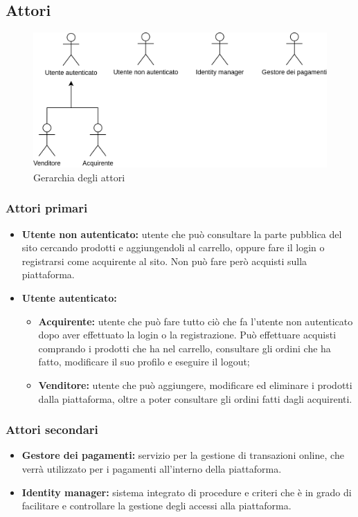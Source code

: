 \subsection{Attori} \label{Attori}

\begin{figure}[ht]
    \centering
    \includegraphics[width=\textwidth]{Immagini/DiagrammiUC/Attori.png}
    \caption{Gerarchia degli attori} 
    \label{fig:attori}
\end{figure}

\subsubsection{Attori primari}
\begin{itemize}
    \item \textbf{Utente non autenticato:} utente che può consultare la parte pubblica del sito cercando prodotti e aggiungendoli al carrello, oppure fare il login o registrarsi come acquirente al sito. Non può fare però acquisti sulla piattaforma.
    \item \textbf{Utente autenticato:}
    \begin{itemize}
        \item \textbf{Acquirente:} utente che può fare tutto ciò che fa l'utente non autenticato dopo aver effettuato la login o la registrazione. Può effettuare acquisti comprando i prodotti che ha nel carrello, consultare gli ordini che ha fatto, modificare il suo profilo e eseguire il logout;
        \item \textbf{Venditore:} utente che può aggiungere, modificare ed eliminare i prodotti dalla piattaforma, oltre a poter consultare gli ordini fatti dagli acquirenti.
    \end{itemize}
\end{itemize}
\subsubsection{Attori secondari}
\begin{itemize}
\item \textbf{Gestore dei pagamenti:} servizio per la gestione di transazioni online, che verrà utilizzato per i pagamenti all'interno della piattaforma.%
\item \textbf{Identity manager:} sistema integrato di procedure e criteri che è in grado di facilitare e controllare la gestione degli accessi alla piattaforma. 
\end{itemize}
